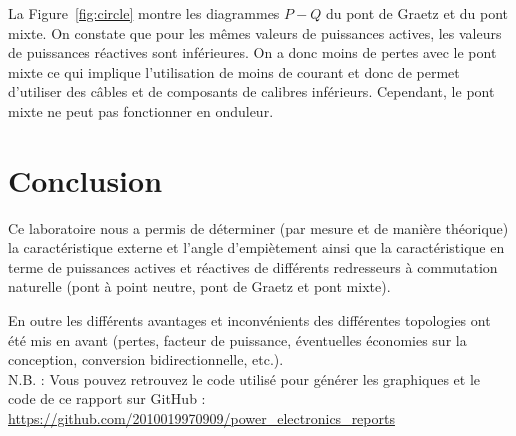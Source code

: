 \documentclass[a4paper, 11pt, openany, oneside, french]{article}
\begin{document}
La Figure~\ref{fig:circle} montre les diagrammes $P-Q$ du pont de Graetz et du pont mixte. On constate que pour les mêmes valeurs de puissances actives, les valeurs de puissances réactives sont inférieures. On a donc moins de pertes avec le pont mixte ce qui implique l'utilisation de moins de courant et donc de permet d'utiliser des câbles et de composants de calibres inférieurs. Cependant, le pont mixte ne peut pas fonctionner en onduleur.

\section*{Conclusion}

Ce laboratoire nous a permis de déterminer (par mesure et de manière théorique) la caractéristique externe et l'angle d'empiètement ainsi que la caractéristique en terme de puissances actives et réactives de différents redresseurs à commutation naturelle (pont à point neutre, pont de Graetz et pont mixte).

En outre les différents avantages et inconvénients des différentes topologies ont été mis en avant (pertes, facteur de puissance, éventuelles économies sur la conception, conversion bidirectionnelle, etc.).\\

N.B. : Vous pouvez retrouvez le code utilisé pour générer les graphiques et le code de ce rapport sur GitHub : \url{https://github.com/2010019970909/power_electronics_reports}
\end{document}

